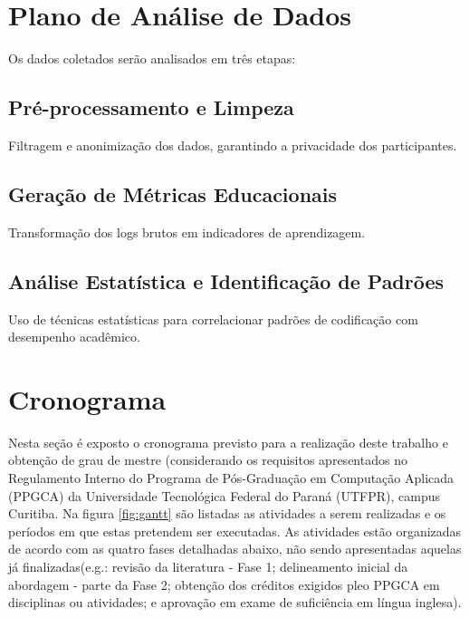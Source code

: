 \section{Plano de Análise de Dados}
\label{sec:analise-dados}

Os dados coletados serão analisados em três etapas:

\subsection{Pré-processamento e Limpeza}\label{subsec:limpeza}
Filtragem e anonimização dos dados, garantindo a privacidade dos participantes.

\subsection{Geração de Métricas Educacionais}\label{subsec:metricas}
Transformação dos logs brutos em indicadores de aprendizagem.

\subsection{Análise Estatística e Identificação de Padrões}\label{subsec:identificacoes-padroes}
Uso de técnicas estatísticas para correlacionar padrões de codificação com desempenho acadêmico.


\section{Cronograma}
\label{sec:cronograma}
Nesta seção é exposto o cronograma previsto para a realização deste trabalho e obtenção de grau de mestre (considerando os requisitos apresentados no Regulamento Interno do Programa de Pós-Graduação em Computação Aplicada (PPGCA) da Universidade Tecnológica Federal do Paraná (UTFPR), campus Curitiba. 
    Na figura \ref{fig:gantt} são listadas as atividades a serem realizadas e os períodos em que estas pretendem ser executadas. As atividades estão organizadas de acordo com as quatro fases detalhadas abaixo, não sendo apresentadas aquelas já finalizadas(e.g.: revisão da literatura - Fase 1; delineamento inicial da abordagem - parte da Fase 2; obtenção dos créditos exigidos pleo PPGCA em disciplinas ou atividades; e aprovação em exame de suficiência em língua inglesa).
    
